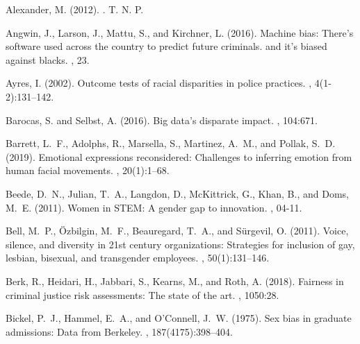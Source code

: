 \documentclass[11pt,dvipdfm]{article}
\begin{document}
\begin{thebibliography}{}
	
	Alexander, M. (2012).
	.
	\newblock T. N. P.
	
	Angwin, J., Larson, J., Mattu, S., and Kirchner, L. (2016).
	\newblock Machine bias: There's software used across the country to predict
	future criminals. and it's biased against blacks.
	, 23.
	
	Ayres, I. (2002).
	\newblock Outcome tests of racial disparities in police practices.
	, 4(1-2):131--142.
	
	Barocas, S. and Selbst, A. (2016).
	\newblock Big data's disparate impact.
	, 104:671.
	
	Barrett, L.~F., Adolphs, R., Marsella, S., Martinez, A.~M., and Pollak, S.~D.
	(2019).
	\newblock Emotional expressions reconsidered: Challenges to inferring emotion
	from human facial movements.
	, 20(1):1--68.
	
	Beede, D.~N., Julian, T.~A., Langdon, D., McKittrick, G., Khan, B., and Doms,
	M.~E. (2011).
	\newblock Women in STEM: A gender gap to innovation.
	, 04-11.
	
	Bell, M.~P., {\"O}zbilgin, M.~F., Beauregard, T.~A., and S{\"u}rgevil, O.
	(2011).
	\newblock Voice, silence, and diversity in 21st century organizations:
	Strategies for inclusion of gay, lesbian, bisexual, and transgender
	employees.
	, 50(1):131--146.
	
	Berk, R., Heidari, H., Jabbari, S., Kearns, M., and Roth, A. (2018).
	\newblock Fairness in criminal justice risk assessments: The state of the art.
	, 1050:28.
	
	Bickel, P.~J., Hammel, E.~A., and O'Connell, J.~W. (1975).
	\newblock Sex bias in graduate admissions: Data from {B}erkeley.
	, 187(4175):398--404.
	

\end{thebibliography}
\end{document}
